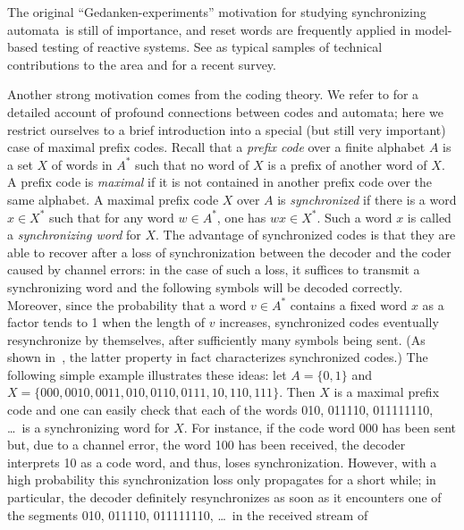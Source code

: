 \documentclass{irmaart}
\newcommand{\sa}{synchronizing au\-tom\-a\-ta}
\begin{document}
The original ``Gedanken-experiments'' motivation for studying \sa\
is still of importance, and reset words are frequently applied in
model-based testing of reactive systems. See \cite{Cho&Jeong&Somenzi&Pixley:1993,
Boppana&Rajan&Takayama&Fujita:1999} as typical samples of technical
contributions to the area and \cite{Sandberg:2005} for a recent survey.

Another strong motivation comes from the coding theory. We refer
to \cite[Chapters~3 and~10]{Berstel&Perrin&Reutenauer:2009} for a
detailed account of profound connections between codes and
automata; here we restrict ourselves to a brief introduction into
a special (but still very important) case of maximal prefix codes.
Recall that a \emph{prefix code}\index{prefix code} over a finite
alphabet $A$ is a set $X$ of words in $A^*$ such that no word of
$X$ is a prefix of another word of $X$. A prefix code is
\emph{maximal} if it is not contained
in another prefix code over the same alphabet. A maximal prefix
code $X$ over $A$ is \emph{synchronized} if there is a word $x\in X^*$ such that for any
word $w\in A^*$, one has $wx\in X^*$. Such a word $x$ is called a
\emph{synchronizing word}\index{synchronizing word of a code} for
$X$. The advantage of synchronized codes is that they are able to
recover after a loss of synchronization between the decoder and
the coder caused by channel errors: in the case of such a loss, it
suffices to transmit a synchronizing word and the following
symbols will be decoded correctly. Moreover, since the probability
that a word $v\in A^*$ contains a fixed word $x$ as a factor tends
to 1 when the length of $v$ increases, synchronized codes
eventually resynchronize by themselves, after sufficiently many
symbols being sent. (As shown
in~\cite{Capocelli&Gargano&Vaccaro:1988}, the latter property in
fact characterizes synchronized codes.) The following simple
example illustrates these ideas: let $A=\{0,1\}$ and
$X=\{000,0010,0011,010,0110,0111,10,110,111\}$. Then $X$ is a
maximal prefix code and one can easily check that each of the
words 010, 011110, 011111110, \dots\ is a synchronizing word for
$X$. For instance, if the code word 000 has been sent but, due to
a channel error, the word 100 has been received, the decoder
interprets 10 as a code word, and thus, loses synchronization.
However, with a high probability this synchronization loss only
propagates for a short while; in particular, the decoder
definitely resynchronizes as soon as it encounters one of the
segments 010, 011110, 011111110, \dots\ in the received stream of
\end{document}
